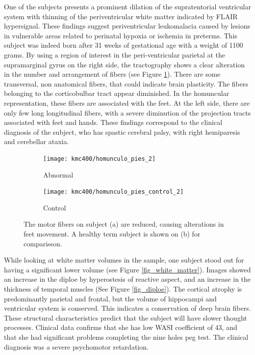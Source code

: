 One of the subjects presents a prominent dilation of the supratentorial ventricular system with thinning of the periventricular white matter indicated by FLAIR hypersignal. These findings suggest periventricular leukomalacia caused by lesions in vulnerable areas related to perinatal hypoxia or ischemia in preterms. This subject was indeed born after 31 weeks of gestational age with a weight of 1100 grams. By using a region of interest in the peri-ventricular parietal at the supramarginal gyrus on the right side, the tractography shows a clear alteration in the number and arrangement of fibers (see Figure \ref{fig_homunculus_feet}). There are some transversal, non anatomical fibers, that could indicate brain plasticity. The fibers belonging to the corticobulbar tract appear diminished. In the homuncular representation, these fibers are associated with the feet. At the left side, there are only few long longitudinal fibers, with a severe diminution of the projection tracts associated with feet and hands. These findings correspond to the clinical diagnosis of the subject, who has spastic cerebral palsy, with right hemiparesis and cerebellar ataxia.  

\begin{figure}
	\centering
	\begin{subfigure}{0.45\textwidth}
		\texttt{[image: kmc400/homunculo\_pies\_2]}
		\caption{Abnormal}
	\end{subfigure}
	\begin{subfigure}{0.45\textwidth}
		\texttt{[image: kmc400/homunculo\_pies\_control\_2]}
		\caption{Control}
	\end{subfigure}
	\caption{The motor fibers on subject (a) are reduced, causing alterations in feet movement. A healthy term subject is shown on (b) for comparisson. }
	\label{fig_homunculus_feet}
\end{figure}

While looking at white matter volumes in the sample, one subject stood out for having a significant lower volume (see Figure \ref{fig_white_matter}). Images showed an increase  in the diploe by hyperostesis of reactive aspect, and an increase in the thickness of temporal muscles (See Figure \ref{fig_diploe}). The cortical atrophy is predominantly parietal and frontal, but the volume of hippocampi and ventricular system is conserved. This indicates a conservation of deep brain fibers. These structural characteristics predict that the subject will have slower thought processes. Clinical data confirms that she has low WASI coefficient of 43, and that she had significant problems completing the nine holes peg test. The clinical diagnosis was a severe psychomotor retardation.


